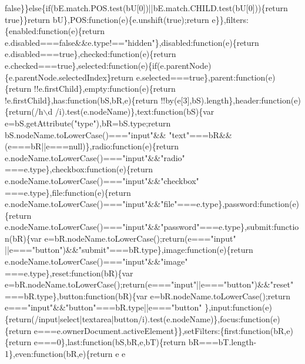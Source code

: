 \begin{DoxyCode}
{       false\}\}else\{if(bE.match.POS.test(bU[0])||bE.match.CHILD.test(bU[0]))\{return true\}\}return bU\},POS:function(e)\{e.unshift(true);return
       e\}\},filters:\{enabled:function(e)\{return e.disabled===false&&e.type!=="}hidden\textcolor{stringliteral}{"\},disabled:function(e)\{return
       e.disabled===true\},checked:function(e)\{return
       e.checked===true\},selected:function(e)\{if(e.parentNode)\{e.parentNode.selectedIndex\}return e.selected===true\},parent:function(e)\{return !!e.firstChild\},empty:function(e)\{return
       !e.firstChild\},has:function(bS,bR,e)\{return !!by(e[3],bS).length\},header:function(e)\{return(/h\(\backslash\)d
      /i).test(e.nodeName)\},text:function(bS)\{var e=bS.getAttribute("}type\textcolor{stringliteral}{"),bR=bS.type;return bS.nodeName.toLowerCase()==="}input\textcolor{stringliteral}{"&&
      "}text\textcolor{stringliteral}{"===bR&&(e===bR||e===null)\},radio:function(e)\{return e.nodeName.toLowerCase()==="}input\textcolor{stringliteral}{"&&"}radio\textcolor{stringliteral}{"
      ===e.type\},checkbox:function(e)\{return e.nodeName.toLowerCase()==="}input\textcolor{stringliteral}{"&&"}checkbox\textcolor{stringliteral}{"
      ===e.type\},file:function(e)\{return e.nodeName.toLowerCase()==="}input\textcolor{stringliteral}{"&&"}file\textcolor{stringliteral}{"===e.type\},password:function(e)\{return
       e.nodeName.toLowerCase()==="}input\textcolor{stringliteral}{"&&"}password\textcolor{stringliteral}{"===e.type\},submit:function(bR)\{var e=bR.nodeName.toLowerCase();return(e==="}input\textcolor{stringliteral}{"
      ||e==="}button\textcolor{stringliteral}{")&&"}submit\textcolor{stringliteral}{"===bR.type\},image:function(e)\{return e.nodeName.toLowerCase()==="}input\textcolor{stringliteral}{"&&"}image\textcolor{stringliteral}{"
      ===e.type\},reset:function(bR)\{var e=bR.nodeName.toLowerCase();return(e==="}input\textcolor{stringliteral}{"||e==="}button\textcolor{stringliteral}{")&&"}reset\textcolor{stringliteral}{"
      ===bR.type\},button:function(bR)\{var e=bR.nodeName.toLowerCase();return e==="}input\textcolor{stringliteral}{"&&"}button\textcolor{stringliteral}{"===bR.type||e==="}button\textcolor{stringliteral}{"
      \},input:function(e)\{return(/input|select|textarea|button/i).test(e.nodeName)\},focus:function(e)\{return
       e===e.ownerDocument.activeElement\}\},setFilters:\{first:function(bR,e)\{return e===0\},last:function(bS,bR,e,bT)\{return
       bR===bT.length-1\},even:function(bR,e)\{return e%
       e%
}
\end{DoxyCode}
